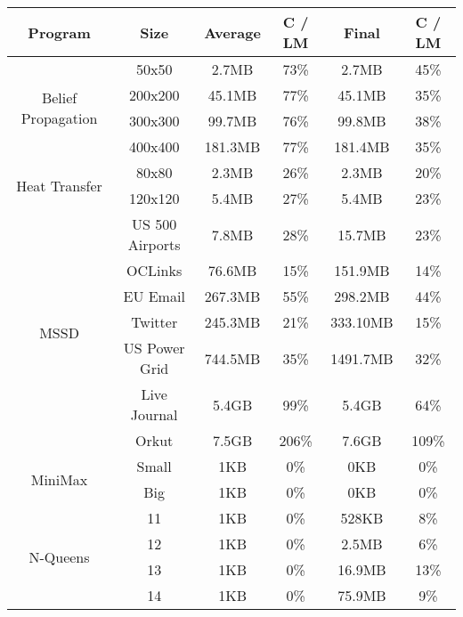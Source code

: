 \begin{tabular}{c | c || c | c || c | c} \hline
	\textbf{Program} & \textbf{Size} & \textbf{Average} & \textbf{C / LM} & \textbf{Final} & \textbf{C / LM} \\ \hline \hline
	\multirow{4}{*}{Belief Propagation}  & 50x50 & 2.7MB & 73\% & 2.7MB  &  45\%
\\
		 & 200x200 & 45.1MB & 77\% & 45.1MB  &  35\%
\\
		 & 300x300 & 99.7MB & 76\% & 99.8MB  &  38\%
\\
		 & 400x400 & 181.3MB & 77\% & 181.4MB  &  35\%
\\
	\hline
	\multirow{2}{*}{Heat Transfer}  & 80x80 & 2.3MB & 26\% & 2.3MB  &  20\%
\\
		 & 120x120 & 5.4MB & 27\% & 5.4MB  &  23\%
\\
	\hline
	\multirow{7}{*}{MSSD}  & US 500 Airports & 7.8MB & 28\% & 15.7MB  &  23\%
\\
		 & OCLinks & 76.6MB & 15\% & 151.9MB  &  14\%
\\
		 & EU Email & 267.3MB & 55\% & 298.2MB  &  44\%
\\
		 & Twitter & 245.3MB & 21\% & 333.10MB  &  15\%
\\
		 & US Power Grid & 744.5MB & 35\% & 1491.7MB  &  32\%
\\
		 & Live Journal & 5.4GB & 99\% & 5.4GB  &  64\%
\\
		 & Orkut & 7.5GB & 206\% & 7.6GB  &  109\%
\\
	\hline
	\multirow{2}{*}{MiniMax}  & Small & 1KB & 0\% & 0KB  &  0\%
\\
		 & Big & 1KB & 0\% & 0KB  &  0\%
\\
	\hline
	\multirow{4}{*}{N-Queens}  & 11 & 1KB & 0\% & 528KB  &  8\%
\\
		 & 12 & 1KB & 0\% & 2.5MB  &  6\%
\\
		 & 13 & 1KB & 0\% & 16.9MB  &  13\%
\\
		 & 14 & 1KB & 0\% & 75.9MB  &  9\%
\\
	\hline
\end{tabular}
